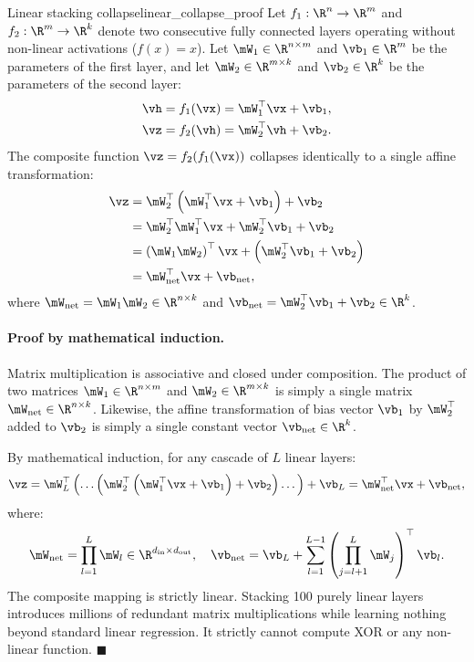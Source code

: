\documentclass[../../main.tex]{subfiles}
\begin{document}
\begin{theorem}{Linear stacking collapse}{linear_collapse_proof}
Let $f_1: \R^n \to \R^m$ and $f_2: \R^m \to \R^k$ denote two consecutive fully connected layers operating without non-linear activations ($f(x) = x$). Let $\mW_1 \in \R^{n \times m}$ and $\vb_1 \in \R^m$ be the parameters of the first layer, and let $\mW_2 \in \R^{m \times k}$ and $\vb_2 \in \R^k$ be the parameters of the second layer:
\begin{align}
\vh &= f_1(\vx) = \mW_1^\top \vx + \vb_1, \label{eq:collapse_layer1} \\
\vz &= f_2(\vh) = \mW_2^\top \vh + \vb_2. \label{eq:collapse_layer2}
\end{align}
The composite function $\vz = f_2(f_1(\vx))$ collapses identically to a single affine transformation:
\begin{align}
\vz &= \mW_2^\top \left( \mW_1^\top \vx + \vb_1 \right) + \vb_2 \notag \\
&= \mW_2^\top \mW_1^\top \vx + \mW_2^\top \vb_1 + \vb_2 \notag \\
&= \left( \mW_1 \mW_2 \right)^\top \vx + \left( \mW_2^\top \vb_1 + \vb_2 \right) \notag \\
&= \mW_{\text{net}}^\top \vx + \vb_{\text{net}}, \label{eq:collapse_final}
\end{align}
where $\mW_{\text{net}} = \mW_1 \mW_2 \in \R^{n \times k}$ and $\vb_{\text{net}} = \mW_2^\top \vb_1 + \vb_2 \in \R^k$.
\end{theorem}

\paragraph{Proof by mathematical induction.}
Matrix multiplication is associative and closed under composition. The product of two matrices $\mW_1 \in \R^{n \times m}$ and $\mW_2 \in \R^{m \times k}$ is simply a single matrix $\mW_{\text{net}} \in \R^{n \times k}$. Likewise, the affine transformation of bias vector $\vb_1$ by $\mW_2^\top$ added to $\vb_2$ is simply a single constant vector $\vb_{\text{net}} \in \R^k$. 

By mathematical induction, for any cascade of $L$ linear layers:
\begin{equation}
\label{eq:induction_collapse}
\vz = \mW_L^\top \left( \dots \left( \mW_2^\top \left( \mW_1^\top \vx + \vb_1 \right) + \vb_2 \right) \dots \right) + \vb_L = \mW_{\text{net}}^\top \vx + \vb_{\text{net}},
\end{equation}
where:
\begin{equation}
\mW_{\text{net}} = \prod_{l=1}^L \mW_l \in \R^{d_{\text{in}} \times d_{\text{out}}}, \quad \vb_{\text{net}} = \vb_L + \sum_{l=1}^{L-1} \left( \prod_{j=l+1}^L \mW_j \right)^\top \vb_l.
\end{equation}
The composite mapping is strictly linear. Stacking 100 purely linear layers introduces millions of redundant matrix multiplications while learning nothing beyond standard linear regression. It strictly cannot compute XOR or any non-linear function. \hfill $\blacksquare$
\end{document}
